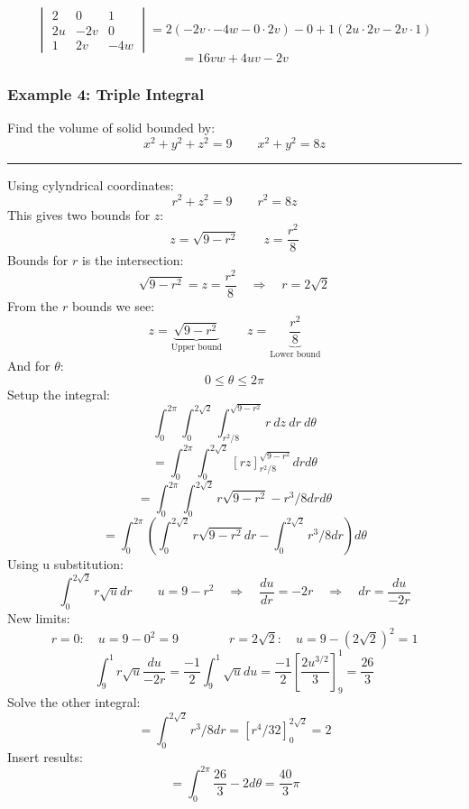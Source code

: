 $$\begin{vmatrix}
  2&0&1\\
  2u&-2v&0\\
  1&2v&-4w
\end{vmatrix}=2(-2v\cdot-4w-0\cdot2v)-0+1(2u\cdot2v-2v\cdot1)$$
$$=16vw+4uv-2v$$

\subsubsection{Example 4: Triple Integral}
Find the volume of solid bounded by:
$$x^2+y^2+z^2=9\qquad x^2+y^2=8z$$

\rule{\textwidth}{1pt}

Using cylyndrical coordinates:
$$r^2+z^2=9\qquad r^2=8z$$
This gives two bounds for $z$:
$$z=\sqrt{9-r^2}\qquad z=\frac{r^2}{8}$$
Bounds for $r$ is the intersection:
$$\sqrt{9-r^2}= z=\frac{r^2}{8}\quad\Rightarrow\quad r=2\sqrt{2}$$
From the $r$ bounds we see:
$$z=\underbrace{\sqrt{9-r^2}}_\text{Upper bound}\qquad z=\underbrace{\frac{r^2}{8}}_\text{Lower bound}$$
And for $\theta$:
$$0\leq\theta\leq 2\pi$$
Setup the integral:
$$\int_{0}^{2\pi}\int_{0}^{2\sqrt{2}}\int_{r^2/8}^{\sqrt{9-r^2}}r\ dz\ dr\ d\theta$$
$$=\int_{0}^{2\pi}\int_{0}^{2\sqrt{2}}\left[rz \right]_{r^2/8}^{\sqrt{9-r^2}} dr d\theta$$
$$=\int_{0}^{2\pi}\int_{0}^{2\sqrt{2}}r\sqrt{9-r^2}- r^3/8 dr d\theta$$
$$=\int_{0}^{2\pi}\left(\int_{0}^{2\sqrt{2}}r\sqrt{9-r^2}dr-\int_{0}^{2\sqrt{2}}r^3/8 dr \right)d\theta$$
Using u substitution:
$$\int_{0}^{2\sqrt{2}}r\sqrt{u}dr\qquad u=9-r^2\quad\Rightarrow\quad \frac{du}{dr}=-2r\quad\Rightarrow\quad dr=\frac{du}{-2r}$$
New limits:
$$r=0:\quad u=9-0^2=9\qquad\qquad r=2\sqrt{2}:\quad u=9-(2\sqrt{2})^2=1$$
$$\int_{9}^{1}r\sqrt{u}\frac{du}{-2r}=\frac{-1}{2}\int_{9}^{1}\sqrt{u}du=\frac{-1}{2}\left[\frac{2 u^{3/2}}{3}\right]_{9}^{1}=\frac{26}{3}$$
Solve the other integral:
$$=\int_{0}^{2\sqrt{2}}r^3/8 dr=\left[r^4/32 \right]_{0}^{2\sqrt{2}}=2$$
Insert results:
$$=\int_{0}^{2\pi}\frac{26}{3}-2d\theta=\boxed{\frac{40}{3}\pi}$$
